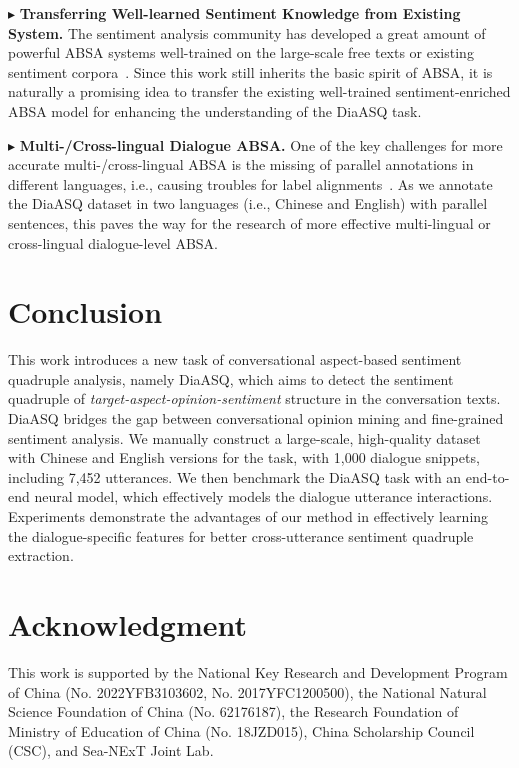 \documentclass[11pt]{article}
\begin{document}
\vspace{4pt}
\noindent$\blacktriangleright$ \textbf{Transferring Well-learned Sentiment Knowledge from Existing System.}
The sentiment analysis community has developed a great amount of powerful ABSA systems well-trained on the large-scale free texts or existing sentiment corpora~\cite{XuSYL20,TianGXLHWWW20,LiZZZW21}.
Since this work still inherits the basic spirit of ABSA, it is naturally a promising idea to transfer the existing well-trained sentiment-enriched ABSA model for enhancing the understanding of the DiaASQ task.

\vspace{4pt}
\noindent$\blacktriangleright$ \textbf{Multi-/Cross-lingual Dialogue ABSA.}
One of the key challenges for more accurate multi-/cross-lingual ABSA is the missing of parallel annotations in different languages, i.e., causing troubles for label alignments~\cite{feng-wan-2019-learning,fei-li-2020-cross,zhang-etal-2021-cross}.
As we annotate the DiaASQ dataset in two languages (i.e., Chinese and English) with parallel sentences, this paves the way for the research of more effective multi-lingual or cross-lingual dialogue-level ABSA.

\vspace{-2mm}
\section{Conclusion} 

\vspace{-1mm}
This work introduces a new task of conversational aspect-based sentiment quadruple analysis, namely DiaASQ, which aims to detect the sentiment quadruple of \emph{target-aspect-opinion-sentiment} structure in the conversation texts.
DiaASQ bridges the gap between conversational opinion mining and fine-grained sentiment analysis.
We manually construct a large-scale, high-quality dataset with Chinese and English versions for the task, with 1,000 dialogue snippets, including 7,452 utterances.
We then benchmark the DiaASQ task with an end-to-end neural model, which effectively models the dialogue utterance interactions.
Experiments demonstrate the advantages of our method in effectively learning the dialogue-specific features for better cross-utterance sentiment quadruple extraction.

\section*{Acknowledgment}
This work is supported by 
the National Key Research and Development Program of China (No. 2022YFB3103602, No. 2017YFC1200500),
the National Natural Science Foundation of China (No. 62176187),
the Research Foundation of Ministry of Education of China (No. 18JZD015),
China Scholarship Council (CSC),
and Sea-NExT Joint Lab.
\end{document}
